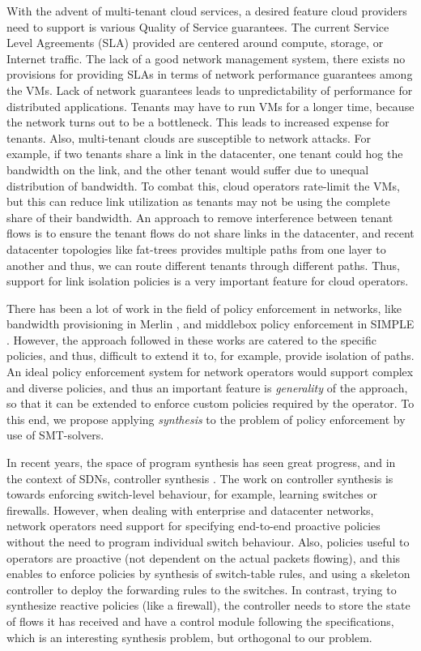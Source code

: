 \documentclass[]{sig}
\begin{document}
With the advent of multi-tenant cloud services, a desired feature cloud providers need to support is various Quality of Service guarantees. The current Service Level Agreements (SLA) provided are centered around compute, storage, or Internet traffic. The lack of a good network management system, there exists no provisions for providing SLAs in terms of network performance guarantees among the VMs. Lack of network guarantees leads to unpredictability of performance for distributed applications. Tenants may have to run VMs for a longer time, because the network turns out to be a bottleneck. This leads to increased expense for tenants. Also, multi-tenant clouds are susceptible to network attacks. For example, if two tenants share a link in the datacenter, one tenant could hog the bandwidth on the link, and the other tenant would suffer due to unequal distribution of bandwidth. To combat this, cloud operators rate-limit the VMs, but this can reduce link utilization as tenants may not be using the complete share of their bandwidth. An approach to remove interference between tenant flows is to ensure the tenant flows do not share links in the datacenter, and recent datacenter topologies like fat-trees provides multiple paths from one layer to another and thus, we can route different tenants through different paths. Thus, support for link isolation policies is a very important feature for cloud operators. 

There has been a lot of work in the field of policy enforcement in networks, like bandwidth provisioning in Merlin \cite{Merlin}, and middlebox policy enforcement in SIMPLE \cite{simple}. However, the approach followed in these works are catered to the specific policies, and thus, difficult to extend it to, for example, provide isolation of paths. An ideal policy enforcement system for network operators would support complex and diverse policies, and thus an important feature is \emph{generality} of the approach, so that it can be extended to enforce custom policies required by the operator. To this end, we propose applying \emph{synthesis} to the problem of policy enforcement by use of SMT-solvers.

In recent years, the space of program synthesis has seen great progress, and in the context of SDNs, controller synthesis \cite{netegg}. The work on controller synthesis is towards enforcing switch-level behaviour, for example, learning switches or firewalls. However, when dealing with enterprise and datacenter networks, network operators need support for specifying end-to-end proactive policies without the need to program individual switch behaviour. Also, policies useful to operators are proactive (not dependent on the actual packets flowing), and this enables to enforce policies by synthesis of switch-table rules, and using a skeleton controller to deploy the forwarding rules to the switches. In contrast, trying to synthesize reactive policies (like a firewall), the controller needs to store the state of flows it has received and have a control module following the specifications, which is an interesting synthesis problem, but orthogonal to our problem.
\end{document}

